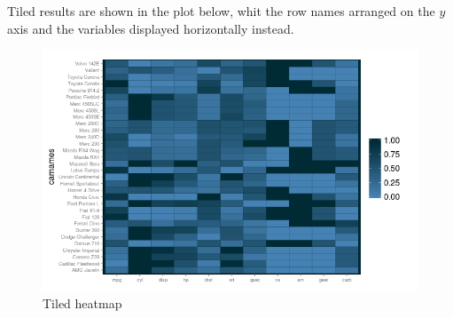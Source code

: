 Tiled results are shown in the plot below, whit the 
row names arranged on the $y$ axis and the variables 
displayed horizontally instead.
\begin{figure}[htbp]
 \centering
 \includegraphics[scale=0.5]{images/tiles}
 \caption*{Tiled heatmap}
\end{figure}